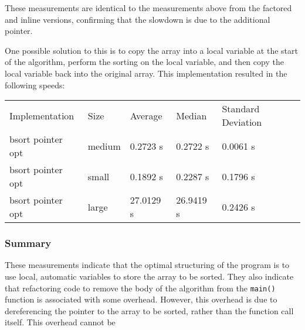 \documentclass{article}
\begin{document}
These measurements are identical to the measurements above from the
factored and inline versions, confirming that the slowdown is due to
the additional pointer.

One possible solution to this is to copy the array into a local
variable at the start of the algorithm, perform the sorting on the
local variable, and then copy the local variable back into the
original array. This implementation resulted in the following speeds:

\begin{center}
\begin{tabular}{lllll}
 Implementation     &  Size    &  Average    &  Median     &  Standard Deviation  \\
 bsort pointer opt  &  medium  &  0.2723 s   &  0.2722 s   &  0.0061 s            \\
 bsort pointer opt  &  small   &  0.1892 s   &  0.2287 s   &  0.1796 s            \\
 bsort pointer opt  &  large   &  27.0129 s  &  26.9419 s  &  0.2426 s            \\
\end{tabular}
\end{center}

\subsubsection{Summary}
These measurements indicate that the optimal structuring of the
program is to use local, automatic variables to store the array to be
sorted. They also indicate that refactoring code to remove the body of
the algorithm from the \texttt{main()} function is associated with
some overhead. However, this overhead is due to dereferencing the
pointer to the array to be sorted, rather than the function call
itself. This overhead cannot be 



\nocite{*}
\end{document}
